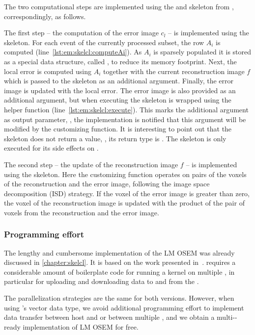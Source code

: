 The two computational steps are implemented using the \map and \zip skeleton from \SkelCL, correspondingly, as follows.

The first step -- the computation of the error image $c_l$ -- is implemented using the \map skeleton.
For each event  of the currently processed subset, the row $A_i$ is computed (line~\ref{lst:em:skelcl:computeAi}).
As $A_i$ is sparsely populated it is stored as a special data structure, called , to reduce its memory footprint.
Next, the local error is computed using $A_i$ together with the current reconstruction image $f$ which is passed to the \map skeleton as an additional argument.
Finally, the error image  is updated with the local error.
The error image is also provided as an additional argument, but when executing the \map skeleton  is wrapped using the  helper function (line~\ref{lst:em:skelcl:execute}).
This marks the additional argument as output parameter, \ie, the \SkelCL implementation is notified that this argument will be modified by the customizing function.
It is interesting to point out that the \map skeleton does not return a value, \ie, its return type is .
The skeleton is only executed for its side effects on .

The second step -- the update of the reconstruction image $f$ -- is implemented using the \zip skeleton.
Here the customizing function operates on pairs of the voxels of the reconstruction and the error image, following the image space decomposition (ISD) strategy.
If the voxel of the error image is greater than zero, the voxel of the reconstruction image is updated with the product of the pair of voxels from the reconstruction and the error image.







\subsubsection*{Programming effort}
The lengthy and cumbersome \OpenCL implementation of the LM OSEM was already discussed in \autoref{chapter:skelcl}.
It is based on the work presented in~\cite{SchellmannGoMeKoScWuBu2009}.
\OpenCL requires a considerable amount of boilerplate code for running a kernel on multiple \GPUs, in particular for uploading and downloading data to and from the \GPUs.

The parallelization strategies are the same for both versions.
However, when using \SkelCL's vector data type, we avoid additional programming effort to implement data transfer between host and \GPU or between multiple \GPUs, and we obtain a multi-\GPU-ready implementation of LM OSEM for free.

